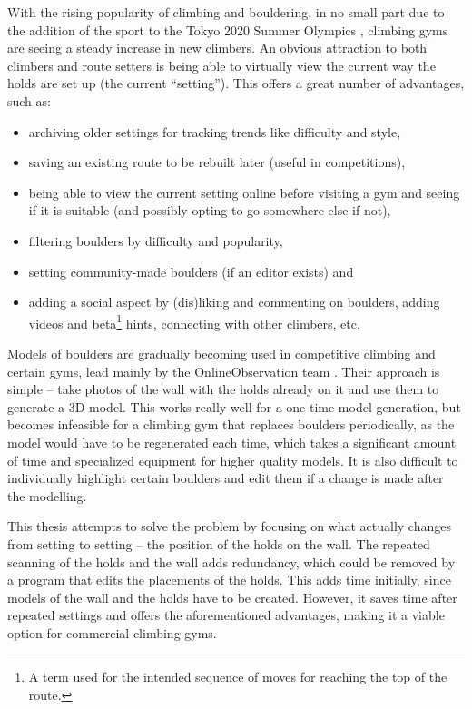 
With the rising popularity of climbing and bouldering, in no small part due to the addition of the sport to the Tokyo 2020 Summer Olympics \cite{olympics}, climbing gyms are seeing a steady increase in new climbers.
An obvious attraction to both climbers and route setters is being able to virtually view the current way the holds are set up (the current ``setting'').
This offers a great number of advantages, such as:

\begin{itemize}
	\item archiving older settings for tracking trends like difficulty and style,
	\item saving an existing route to be rebuilt later (useful in competitions),
	\item being able to view the current setting online before visiting a gym and seeing if it is suitable (and possibly opting to go somewhere else if not),
	\item filtering boulders by difficulty and popularity,
	\item setting community-made boulders (if an editor exists) and
	\item adding a social aspect by (dis)liking and commenting on boulders, adding videos and beta\footnote{A term used for the intended sequence of moves for reaching the top of the route.} hints, connecting with other climbers, etc.
\end{itemize}

Models of boulders are gradually becoming used in competitive climbing and certain gyms, lead mainly by the OnlineObservation team \cite{onlineobservation}.
Their approach is simple -- take photos of the wall with the holds already on it and use them to generate a 3D model.
This works really well for a one-time model generation, but becomes infeasible for a climbing gym that replaces boulders periodically, as the model would have to be regenerated each time, which takes a significant amount of time and specialized equipment for higher quality models.
It is also difficult to individually highlight certain boulders and edit them if a change is made after the modelling.

This thesis attempts to solve the problem by focusing on what actually changes from setting to setting -- the position of the holds on the wall.
The repeated scanning of the holds and the wall adds redundancy, which could be removed by a program that edits the placements of the holds.
This adds time initially, since models of the wall and the holds have to be created.
However, it saves time after repeated settings and offers the aforementioned advantages, making it a viable option for commercial climbing gyms.

